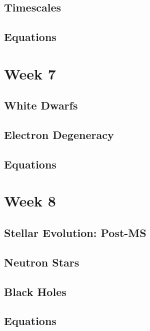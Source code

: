 \documentclass[a4paper,10pt]{article}
\begin{document}
\subsection{Timescales}

\subsection{Equations}

 

\newpage
\section{Week 7}

\subsection{White Dwarfs}

\subsection{Electron Degeneracy}

\subsection{Equations}

\newpage
\section{Week 8}

\subsection{Stellar Evolution: Post-MS}

\subsection{Neutron Stars}

\subsection{Black Holes}

\subsection{Equations}
\end{document}
